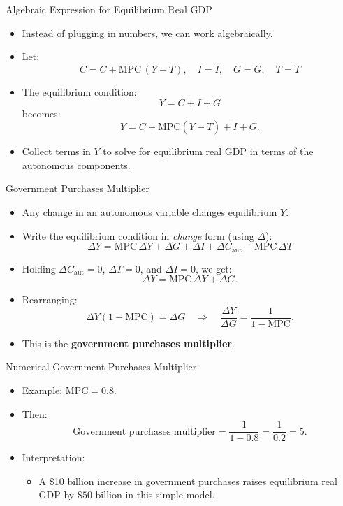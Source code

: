 \documentclass[aspectratio=169]{beamer}
\begin{document}
\begin{frame}{Algebraic Expression for Equilibrium Real GDP}
\transfade
\begin{itemize}
  \item Instead of plugging in numbers, we can work algebraically.
  \item Let:
  \[
    C = \bar{C} + \text{MPC}\,(Y - T), \quad
    I = \bar{I}, \quad
    G = \bar{G}, \quad
    T = \bar{T}
  \]
  \item The equilibrium condition:
  \[
    Y = C + I + G
  \]
  becomes:
  \[
    Y = \bar{C} + \text{MPC}(Y - \bar{T}) + \bar{I} + \bar{G}.
  \]
  \item Collect terms in \(Y\) to solve for equilibrium real GDP in terms of the autonomous components.
\end{itemize}
\end{frame}

\begin{frame}{Government Purchases Multiplier}
\transfade
\begin{itemize}
  \item Any change in an autonomous variable changes equilibrium \(Y\).
  \item Write the equilibrium condition in \emph{change} form (using \(\Delta\)):
  \[
    \Delta Y = \text{MPC} \,\Delta Y + \Delta G + \Delta I + \Delta C_{\text{aut}} - \text{MPC}\,\Delta T
  \]
  \item Holding \(\Delta C_{\text{aut}} = 0\), \(\Delta T = 0\), and \(\Delta I = 0\), we get:
  \[
    \Delta Y = \text{MPC} \,\Delta Y + \Delta G.
  \]
  \item Rearranging:
  \[
    \Delta Y (1 - \text{MPC}) = \Delta G
    \quad \Rightarrow \quad
    \frac{\Delta Y}{\Delta G} = \frac{1}{1 - \text{MPC}}.
  \]
  \item This is the \textbf{government purchases multiplier}.
\end{itemize}
\end{frame}

\begin{frame}{Numerical Government Purchases Multiplier}
\transfade
\begin{itemize}
  \item Example: \(\text{MPC} = 0.8\).
  \item Then:
  \[
    \text{Government purchases multiplier}
      = \frac{1}{1 - 0.8} = \frac{1}{0.2} = 5.
  \]
  \item Interpretation:
  \begin{itemize}
    \item A \$10 billion increase in government purchases raises equilibrium real GDP by \(\$50\) billion in this simple model.
  \end{itemize}
\end{itemize}
\end{frame}
\end{document}

